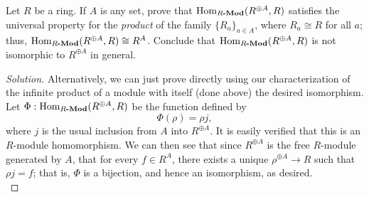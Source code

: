 \documentclass[12pt]{article}
\newenvironment{problem}[2][Problem]{\begin{trivlist}
\item[\hskip \labelsep {\bfseries #1}\hskip \labelsep {\bfseries #2.}]}{\end{trivlist}}
\newcommand{\catname}[1]{\normalfont\textbf{#1}}
\newcommand{\Hom}{\text{Hom}}
\newcommand{\Homod}[2]{\Hom_{#1\catname{-Mod}}(#2)}
\newenvironment{solution}
  {\renewcommand\qedsymbol{$\blacksquare$}\begin{proof}[Solution]}
{\end{proof}}
\theoremstyle{remark}
\begin{document}
\begin{problem}{6.8}
  Let $R$ be a ring.
  If $A$ is any set, prove that $\Homod{R}{R^{\oplus A},R}$ satisfies
  the universal property for the \textit{product} of the family 
  $\{R_a\}_{a\in A}$, where $R_a\cong R$ for all $a$;
  thus, $\Homod{R}{R^{\oplus A},R}\cong R^A$.
  Conclude that $\Homod{R}{R^{\oplus A}, R}$ is not isomorphic to
  $R^{\oplus A}$ in general.
\end{problem}
\begin{solution}
  Alternatively, we can just prove directly using our characterization
  of the infinite product of a module with itself (done above) the desired
  isomorphism.\\ 
  \indent Let $\Phi:\Homod{R}{R^{\oplus A}, R}$ be the function defined by
  \begin{equation*}
    \Phi(\rho) = \rho j,
  \end{equation*}
  where $j$ is the usual inclusion from $A$ into $R^{\oplus A}$.
  It is easily verified that this is an $R$-module homomorphism.
  We can then see that since $R^{\oplus A}$ is the free $R$-module
  generated by $A$, that for every $f\in R^A$, there exists a unique
  $\rho^{\oplus A}\to R$ such that $\rho j=f$; that is,
  $\Phi$ is a bijection, and hence an isomorphism, as desired.\\
\end{solution}
\end{document}

